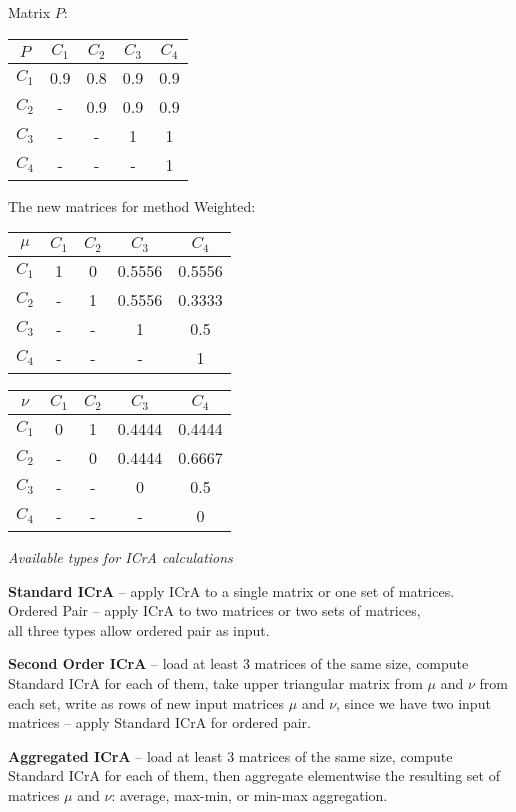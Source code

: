 \documentclass{beamer}
\begin{document}
\begin{frame}
Matrix $P$:
\begin{center}
\begin{tabular}{c|cccc}
$P$ & $C_1$ & $C_2$ & $C_3$ & $C_4$ \\
\hline $C_1$ & 0.9 & 0.8 & 0.9 & 0.9 \\
$C_2$ & - & 0.9 & 0.9 & 0.9 \\
$C_3$ & - & - & 1 & 1 \\
$C_4$ & - & - & - & 1
\end{tabular}
\end{center}

The new matrices for method Weighted:
\begin{center}
\begin{minipage}[b]{0.48\linewidth}
\begin{tabular}{c|cccc}
$\mu$ & $C_1$ & $C_2$ & $C_3$ & $C_4$ \\
\hline $C_1$ & 1 & 0 & 0.5556 & 0.5556 \\
$C_2$ & - & 1 & 0.5556 & 0.3333 \\
$C_3$ & - & - & 1 & 0.5 \\
$C_4$ & - & - & - & 1
\end{tabular}
\end{minipage}
\begin{minipage}[b]{0.48\linewidth}
\begin{tabular}{c|cccc}
$\nu$ & $C_1$ & $C_2$ & $C_3$ & $C_4$ \\
\hline $C_1$ & 0 & 1 & 0.4444 & 0.4444 \\
$C_2$ & - & 0 & 0.4444 & 0.6667 \\
$C_3$ & - & - & 0 & 0.5 \\
$C_4$ & - & - & - & 0
\end{tabular}
\end{minipage}
\end{center}
\end{frame}


\begin{frame}
\textit{Available types for ICrA calculations}

\bigskip
\textbf{Standard ICrA} -- apply ICrA to a single matrix or one set of matrices.\\
Ordered Pair -- apply ICrA to two matrices or two sets of matrices,\\
all three types allow ordered pair as input.

\bigskip
\textbf{Second Order ICrA} -- load at least 3 matrices of the same size, compute Standard ICrA for each of them,
take upper triangular matrix from $\mu$ and $\nu$ from each set, write as rows of new input matrices $\mu$ and $\nu$,
since we have two input matrices -- apply Standard ICrA for ordered pair.

\bigskip
\textbf{Aggregated ICrA} -- load at least 3 matrices of the same size, compute Standard ICrA for each of them,
then aggregate elementwise the resulting set of matrices $\mu$ and $\nu$: average, max-min, or min-max aggregation.
\end{frame}
\end{document}
